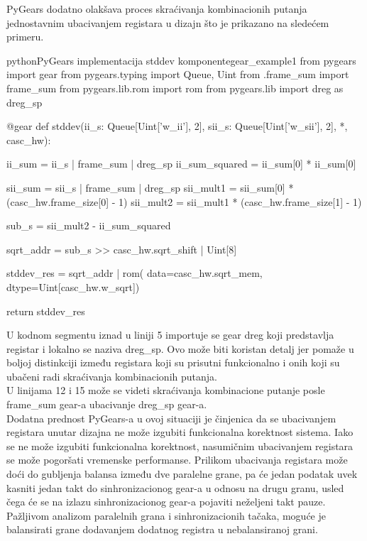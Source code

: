 \newpage

PyGears dodatno olakšava proces skraćivanja kombinacionih putanja jednostavnim
ubacivanjem registara u dizajn što je prikazano na sledećem primeru. \\

\begin{code}[H]{python}{PyGears implementacija stddev komponente}{gear_example1}
from pygears import gear
from pygears.typing import Queue, Uint
from .frame_sum import frame_sum
from pygears.lib.rom import rom
from pygears.lib import dreg as dreg_sp

@gear
def stddev(ii_s: Queue[Uint['w_ii'], 2],
           sii_s: Queue[Uint['w_sii'], 2], *,
           casc_hw):

    ii_sum = ii_s | frame_sum | dreg_sp
    ii_sum_squared = ii_sum[0] * ii_sum[0]

    sii_sum = sii_s | frame_sum | dreg_sp
    sii_mult1 = sii_sum[0] * (casc_hw.frame_size[0] - 1)
    sii_mult2 = sii_mult1 * (casc_hw.frame_size[1] - 1)

    sub_s = sii_mult2 - ii_sum_squared

    sqrt_addr = sub_s >> casc_hw.sqrt_shift | Uint[8]

    stddev_res = sqrt_addr | rom(
        data=casc_hw.sqrt_mem, dtype=Uint[casc_hw.w_sqrt])

    return stddev_res
\end{code}

U kodnom segmentu iznad u liniji 5 importuje se gear dreg koji predstavlja
registar i lokalno se naziva dreg\_sp.
Ovo može biti koristan detalj jer pomaže u boljoj distinkciji između registara
koji su prisutni funkcionalno i onih koji su ubačeni radi skraćivanja
kombinacionih putanja. \\
U linijama 12 i 15 može se videti skraćivanja kombinacione putanje posle
frame\_sum gear-a ubacivanje dreg\_sp gear-a. \\

Dodatna prednost PyGears-a u ovoj situaciji je činjenica da se ubacivanjem
registara unutar dizajna ne može izgubiti funkcionalna korektnost sistema.
Iako se ne može izgubiti funkcionalna korektnost, nasumičnim ubacivanjem
registara se može pogoršati vremenske performanse.
Prilikom ubacivanja registara može doći do gubljenja balansa između dve
paralelne grane, pa će jedan podatak uvek kasniti jedan takt do sinhronizacionog
gear-a u odnosu na drugu granu, usled čega će se na izlazu sinhronizacionog
gear-a pojaviti neželjeni takt pauze.
Pažljivom analizom paralelnih grana i sinhronizacionih tačaka, moguće je
balansirati grane dodavanjem dodatnog registra u nebalansiranoj grani. \\


